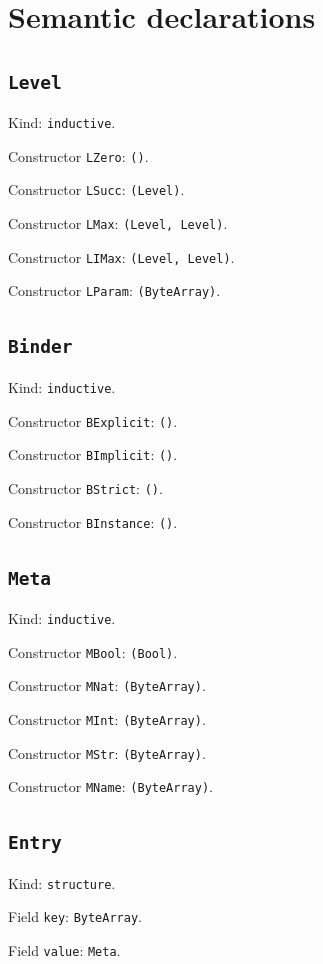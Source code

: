 \documentclass[11pt]{article}
\begin{document}
\section*{Semantic declarations}
\subsection*{\texttt{Level}}
\noindent Kind: \texttt{inductive}.\par
\noindent Constructor \texttt{LZero}: \texttt{()}.\par
\noindent Constructor \texttt{LSucc}: \texttt{(Level)}.\par
\noindent Constructor \texttt{LMax}: \texttt{(Level, Level)}.\par
\noindent Constructor \texttt{LIMax}: \texttt{(Level, Level)}.\par
\noindent Constructor \texttt{LParam}: \texttt{(ByteArray)}.\par
\subsection*{\texttt{Binder}}
\noindent Kind: \texttt{inductive}.\par
\noindent Constructor \texttt{BExplicit}: \texttt{()}.\par
\noindent Constructor \texttt{BImplicit}: \texttt{()}.\par
\noindent Constructor \texttt{BStrict}: \texttt{()}.\par
\noindent Constructor \texttt{BInstance}: \texttt{()}.\par
\subsection*{\texttt{Meta}}
\noindent Kind: \texttt{inductive}.\par
\noindent Constructor \texttt{MBool}: \texttt{(Bool)}.\par
\noindent Constructor \texttt{MNat}: \texttt{(ByteArray)}.\par
\noindent Constructor \texttt{MInt}: \texttt{(ByteArray)}.\par
\noindent Constructor \texttt{MStr}: \texttt{(ByteArray)}.\par
\noindent Constructor \texttt{MName}: \texttt{(ByteArray)}.\par
\subsection*{\texttt{Entry}}
\noindent Kind: \texttt{structure}.\par
\noindent Field \texttt{key}: \texttt{ByteArray}.\par
\noindent Field \texttt{value}: \texttt{Meta}.\par
\end{document}
